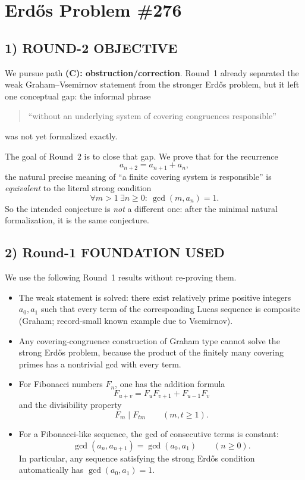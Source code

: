 \section*{Erd\H{o}s Problem \#276}

\subsection*{1) ROUND-2 OBJECTIVE}
We pursue path \textbf{(C): obstruction/correction}. Round~1 already separated the weak Graham--Vsemirnov statement from the stronger Erd\H{o}s problem, but it left one conceptual gap: the informal phrase
\begin{quote}
``without an underlying system of covering congruences responsible''
\end{quote}
was not yet formalized exactly.

The goal of Round~2 is to close that gap. We prove that for the recurrence
\[
a_{n+2}=a_{n+1}+a_n,
\]
the natural precise meaning of ``a finite covering system is responsible'' is \emph{equivalent} to the literal strong condition
\[
\forall m>1\ \exists n\ge 0:\ \gcd(m,a_n)=1.
\]
So the intended conjecture is \emph{not} a different one: after the minimal natural formalization, it is the same conjecture.

\subsection*{2) Round-1 FOUNDATION USED}
We use the following Round~1 results without re-proving them.

\begin{itemize}
\item[(F1)] The weak statement is solved: there exist relatively prime positive integers $a_0,a_1$ such that every term of the corresponding Lucas sequence is composite (Graham; record-small known example due to Vsemirnov).
\item[(F2)] Any covering-congruence construction of Graham type cannot solve the strong Erd\H{o}s problem, because the product of the finitely many covering primes has a nontrivial gcd with every term.
\item[(F3)] For Fibonacci numbers $F_n$, one has the addition formula
\[
F_{u+v}=F_uF_{v+1}+F_{u-1}F_v
\]
and the divisibility property
\[
F_m\mid F_{tm}\qquad (m,t\ge 1).
\]
\item[(F4)] For a Fibonacci-like sequence, the gcd of consecutive terms is constant:
\[
\gcd(a_n,a_{n+1})=\gcd(a_0,a_1)\qquad (n\ge 0).
\]
In particular, any sequence satisfying the strong Erd\H{o}s condition automatically has $\gcd(a_0,a_1)=1$.
\end{itemize}

